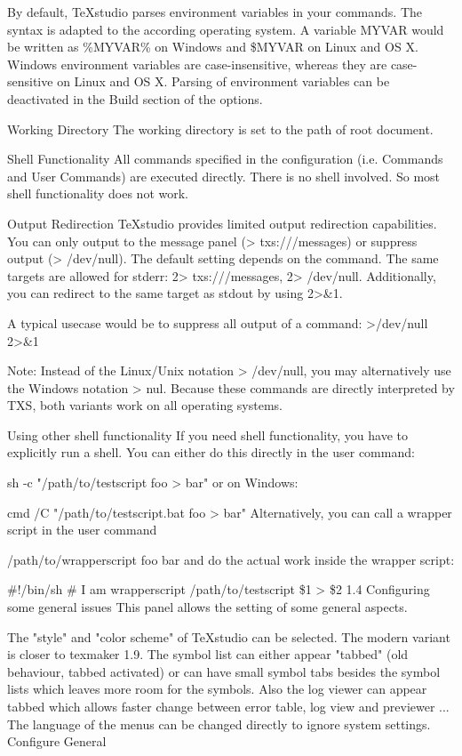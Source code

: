\documentclass{article}
\begin{document}
	By default, TeXstudio parses environment variables in your commands. The syntax is adapted to the according operating system. A variable MYVAR would be written as \%MYVAR\% on Windows and \$MYVAR on Linux and OS X. Windows environment variables are case-insensitive, whereas they are case-sensitive on Linux and OS X. Parsing of environment variables can be deactivated in the Build section of the options.
	
	Working Directory
	The working directory is set to the path of root document.
	
	Shell Functionality
	All commands specified in the configuration (i.e. Commands and User Commands) are executed directly. There is no shell involved. So most shell functionality does not work.
	
	Output Redirection
	TeXstudio provides limited output redirection capabilities. You can only output to the message panel (> txs:///messages) or suppress output (> /dev/null). The default setting depends on the command. The same targets are allowed for stderr: 2> txs:///messages, 2> /dev/null. Additionally, you can redirect to the same target as stdout by using 2>\&1.
	
	A typical usecase would be to suppress all output of a command: >/dev/null 2>\&1
	
	Note: Instead of the Linux/Unix notation > /dev/null, you may alternatively use the Windows notation > nul. Because these commands are directly interpreted by TXS, both variants work on all operating systems.
	
	Using other shell functionality
	If you need shell functionality, you have to explicitly run a shell. You can either do this directly in the user command:
	
	sh -c "/path/to/testscript foo > bar"
	or on Windows:
	
	cmd /C "/path/to/testscript.bat foo > bar"
	Alternatively, you can call a wrapper script in the user command
	
	/path/to/wrapperscript foo bar
	and do the actual work inside the wrapper script:
	
	\#!/bin/sh
	\# I am wrapperscript
	/path/to/testscript \$1 > \$2
	1.4 Configuring some general issues
	This panel allows the setting of some general aspects.
	
	The "style" and "color scheme" of TeXstudio can be selected. The modern variant is closer to texmaker 1.9.
	The symbol list can either appear "tabbed" (old behaviour, tabbed activated) or can have small symbol tabs besides the symbol lists which leaves more room for the symbols.
	Also the log viewer can appear tabbed which allows faster change between error table, log view and previewer ...
	The language of the menus can be changed directly to ignore system settings.
	Configure General
	
\end{document}
